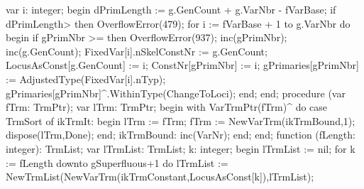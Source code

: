var
   i: integer;
begin
   dPrimLength := g.GenCount + g.VarNbr - fVarBase;
   if dPrimLength> then OverflowError(479);
   for i := fVarBase + 1 to g.VarNbr do
   begin
      if gPrimNbr >=  then OverflowError(937);
      inc(gPrimNbr);
      inc(g.GenCount);
      FixedVar[i].nSkelConstNr := g.GenCount;
      LocusAsConst[g.GenCount] := i;
      ConstNr[gPrimNbr] := i;
      gPrimaries[gPrimNbr] := AdjustedType(FixedVar[i].nTyp);
      gPrimaries[gPrimNbr]^.WithinType(ChangeToLoci);
   end;
end;
\eatline
{}\nwendcode{}\nwdocspar
\nwenddocs{}\endmoddef\nwstartdeflinemarkup{}\nwenddeflinemarkup
procedure (var fTrm: TrmPtr);
var
   lTrm: TrmPtr;
begin
   with VarTrmPtr(fTrm)^ do
      case TrmSort of
         ikTrmIt:
            begin
               lTrm := fTrm;
               fTrm := NewVarTrm(ikTrmBound,1);
               dispose(lTrm,Done);
            end;
         ikTrmBound: inc(VarNr);
      end;
end;
\eatline
{}\nwendcode{}\nwdocspar
\nwenddocs{}\endmoddef\nwstartdeflinemarkup{}\nwenddeflinemarkup
function (fLength: integer): TrmList;
var
   lTrmList: TrmList;
   k: integer;
begin
   lTrmList := nil;
   for k := fLength downto gSuperfluous+1 do
      lTrmList := NewTrmList(NewVarTrm(ikTrmConstant,LocusAsConst[k]),lTrmList);
